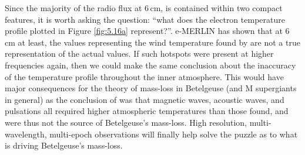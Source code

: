 Since the majority of the radio flux at 6\,cm, is contained within two compact features, it is worth asking the question: ``what does the electron temperature profile plotted in Figure \ref{fig:5.16a} represent?''. e-MERLIN  has shown that at 6\,cm at least, the values representing the wind temperature found by \cite{lim_1998} are not a true representation of the actual values. If such hotspots were present at higher frequencies again, then we could make the same conclusion about the inaccuracy of the temperature profile throughout the inner atmosphere. This would have major consequences for the theory of mass-loss in Betelgeuse (and M supergiants in general) as the conclusion of \cite{lim_1998} was that magnetic waves, acoustic waves, and pulsations all required higher atmospheric temperatures than those found, and were thus not the source of Betelgeuse's mass-loss. High resolution, multi-wavelength, multi-epoch observations will finally help solve the puzzle as to what is driving Betelgeuse's mass-loss.


